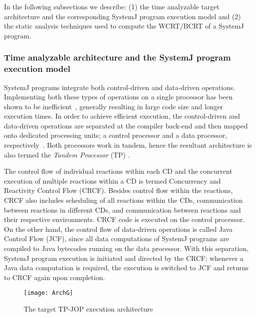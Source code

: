 In the following subsections we describe: (1) the time analyzable target
architecture and the corresponding SystemJ program execution model and
(2) the static analysis techniques used to compute the WCRT/BCRT of a
SystemJ program.

\subsubsection{Time analyzable architecture and the SystemJ program
  execution model}
\label{sec:time-analyz-arch}

SystemJ programs integrate both control-driven and data-driven
operations. Implementing both these types of operations on a single
processor has been shown to be
inefficient~\cite{DBLP:journals/tecs/SalcicM13}, generally resulting in
large code size and longer execution times. In order to achieve
efficient execution, the control-driven and data-driven operations are
separated at the compiler back-end and then mapped onto dedicated
processing units; a control processor and a data processor,
respectively~\cite{DBLP:journals/tecs/SalcicM13}. Both processors work
in tandem, hence the resultant architecture is also termed the
\textit{Tandem Processor} (TP) \cite{DBLP:journals/tecs/SalcicM13}.

The control flow of individual reactions within each CD and the
concurrent execution of multiple reactions within a CD is termed
Concurrency and Reactivity Control Flow (CRCF). Besides control flow
within the reactions, CRCF also includes scheduling of all reactions
within the CDs, communication between reactions in different CDs, and
communication between reactions and their respective environments. CRCF
code is executed on the control processor. On the other hand, the
control flow of data-driven operations is called Java Control Flow
(JCF), since all data computations of SystemJ programs are compiled to
Java bytecodes running on the data processor. With this separation,
SystemJ program execution is initiated and directed by the CRCF;
whenever a Java data computation is required, the execution is switched
to JCF and returns to CRCF again upon completion.

\begin{figure}[t!]
  \centering
  \texttt{[image: ArchG]}
  \caption{The target TP-JOP execution architecture}
  \label{fig:8}
\end{figure}

